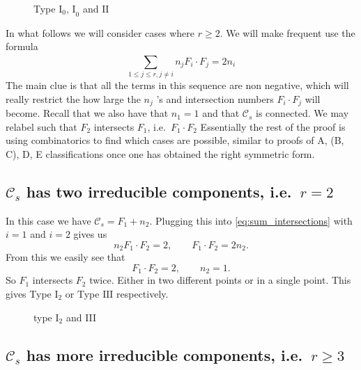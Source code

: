 \documentclass[a4paper]{article}
\begin{document}
\begin{figure}[ht]
    \centering
    \caption{Type $\text{I}_0 \text{, I}_0$ and $\text{II}$}
    \label{fig:type-i2-iii}
\end{figure}

\bigskip
In what follows we will consider cases where $r \ge 2$. We will make frequent use the formula 
\begin{equation}\label{eq:sum_intersections}
	\sum_{1 \le j \le r, j \ne i}^{} n_j F_i \cdot F_j = 2 n_i
\end{equation}
The main clue is that all the terms in this sequence are non negative, which will really restrict the how large the $n_j$ 's and intersection numbers  $F_i \cdot  F_j$ will become.
Recall that we also have that $n_1 = 1$ and that $\mathcal{C} _s$ is connected. We may relabel such that $F_2$ intersects $F_1$, i.e.\  $F_1 \cdot F_2 $ 
Essentially the rest of the proof is using combinatorics to find which cases are possible, similar to proofs of A, (B, C), D, E classifications once one has obtained the right symmetric form.  



\subsection{$\mathcal{C} _s$ has two irreducible components, i.e.\ $r  = 2$} \label{sec:C_s_has_two_irreducible_components}
In this case we have $\mathcal{C} _s = F_1 + n_2$. 
Plugging this into \eqref{eq:sum_intersections} with $i = 1$ and  $i = 2$ gives us \[
n_2 F_1 \cdot F_2 = 2, \qquad F_1 \cdot F_2 = 2 n_2
.\] 
From this we easily see that 
 \[
F_1 \cdot F_2 = 2, \qquad n_2 = 1
.\] 
So $F_1$ intersects $F_2$ twice. Either in two different points or in a single point. This gives Type  $\text{I}_2$ or Type $\text{III}$ respectively. 

\begin{figure}[ht]
    \centering
    \caption{type $\text{I}_2$ and III}
    \label{fig:type-i-and-iii}
\end{figure}


\subsection{$\mathcal{C} _s$ has more irreducible components, i.e.\ $r \ge 3$} \label{sec:S_s_has_more_irreducible_components}
\end{document}
